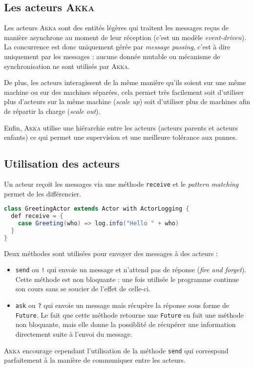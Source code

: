 \documentclass[11pt,a4paper]{article}
\begin{document}
\subsection{Les acteurs \textsc{Akka}}
Les acteurs \textsc{Akka} sont des entités légères qui traitent les messages reçus de manière asynchrone au moment de leur réception (c'est un modèle \textit{event-driven}). La concurrence est donc uniquement gérée par \textit{message passing}, c'est à dire uniquement par les messages : aucune donnée mutable ou mécanisme de synchronisation ne sont utilisés par \textsc{Akka}. 

De plus, les acteurs interagissent de la même manière qu'ils soient sur une même machine ou sur des machines séparées, cela permet très facilement soit d'utiliser plus d'acteurs sur la même machine (\textit{scale up}) soit d'utiliser plus de machines afin de répartir la charge (\textit{scale out}).

Enfin, \textsc{Akka} utilise une hiérarchie entre les acteurs (acteurs parents et acteurs enfants) ce qui permet une supervision et une meilleure tolérance aux pannes.

\subsection{Utilisation des acteurs}
Un acteur reçoit les messages via une méthode \texttt{receive} et le \textit{pattern matching} permet de les différencier.
\begin{lstlisting}[language = java]
class GreetingActor extends Actor with ActorLogging {
  def receive = {
	case Greeting(who) => log.info("Hello " + who)
  }
}
\end{lstlisting}

Deux méthodes sont utilisées pour envoyer des messages à des acteurs : 
\begin{itemize}
\item \texttt{send} ou \texttt{!} qui envoie un message et n'attend pas de réponse (\textit{fire and forget}). Cette méthode est non bloquante : une fois utilisée le programme continue son cours sans se soucier de l'effet de celle-ci.
\item \texttt{ask} ou \texttt{?} qui envoie un message mais récupère la réponse sous forme de \texttt{Future}. Le fait que cette méthode retourne une \texttt{Future} en fait une méthode non bloquante, mais elle donne la possiblité de récupérer une information directement suite à l'envoi du message.\\
\end{itemize}

\textsc{Akka} encourage cependant l'utilisation de la méthode \texttt{send} qui correspond parfaitement à la manière de communiquer entre les acteurs.

\nocite{*}
{}
\end{document}
